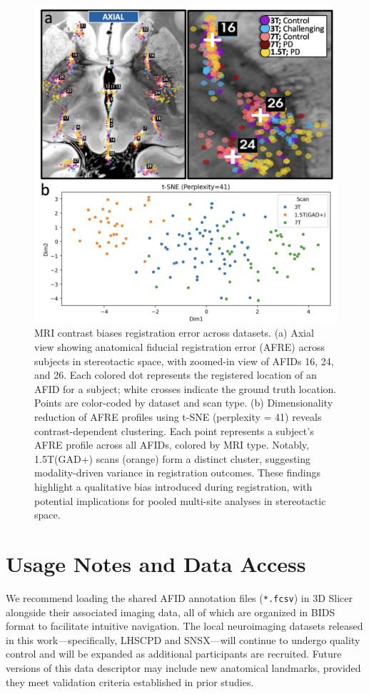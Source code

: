 \begin{figure}
    \centering
    \includegraphics[width=1\linewidth]{figs/ch2_Figure_bias.png}
    \caption{MRI contrast biases registration error across datasets. (a) Axial view showing anatomical fiducial registration error (AFRE) across subjects in stereotactic space, with zoomed-in view of AFIDs 16, 24, and 26. Each colored dot represents the registered location of an AFID for a subject; white crosses indicate the ground truth location. Points are color-coded by dataset and scan type. (b) Dimensionality reduction of AFRE profiles using t-SNE (perplexity = 41) reveals contrast-dependent clustering. Each point represents a subject's AFRE profile across all AFIDs, colored by MRI type. Notably, 1.5T(GAD+) scans (orange) form a distinct cluster, suggesting modality-driven variance in registration outcomes. These findings highlight a qualitative bias introduced during registration, with potential implications for pooled multi-site analyses in stereotactic space.
    }
    \label{fig:ch2_Figure_bias}
\end{figure}



\section{Usage Notes and Data Access}
We recommend loading the shared AFID annotation files (\texttt{*.fcsv}) in 3D Slicer alongside their associated imaging data, all of which are organized in BIDS format to facilitate intuitive navigation. The local neuroimaging datasets released in this work—specifically, LHSCPD and SNSX—will continue to undergo quality control and will be expanded as additional participants are recruited. Future versions of this data descriptor may include new anatomical landmarks, provided they meet validation criteria established in prior studies.

